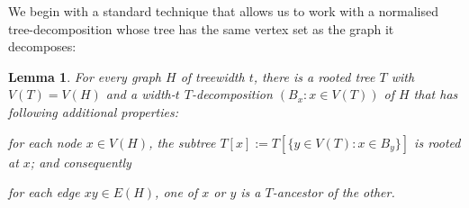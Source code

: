 \documentclass{patmorin}
\theoremstyle{plain}
\newtheorem{lem}[thm]{Lemma}
\theoremstyle{definition}
\newcommand{\note}[2]{\noindent{\color{red}[#1:~#2]}}
\newcommand{\tlabel}[1]{\label{t:#1}}
\renewcommand{\le}{\leqslant}
\begin{document}

We begin with a standard technique that allows us to work with a normalised tree-decomposition whose tree has the same vertex set as the graph it decomposes:

\begin{lem}\label{nice-decomposition}
  For every graph $H$ of treewidth $t$, there is a rooted tree $T$ with $V(T)=V(H)$ and a width-$t$ $T$-decomposition $(B_x:x\in V(T))$ of $H$ that has following additional properties:
  \begin{compactenum}[(T1)]
    \item\tlabel{subtree-root} for each node $x\in V(H)$, the subtree $T[x]:=T[\{y\in V(T):x\in B_y\}]$ is rooted at $x$; and consequently
    \item\tlabel{ancestor-edge}\tlabel{last} for each edge $xy\in E(H)$, one of $x$ or $y$ is a $T$-ancestor of the other.
  \end{compactenum}
\end{lem}
\end{document}
